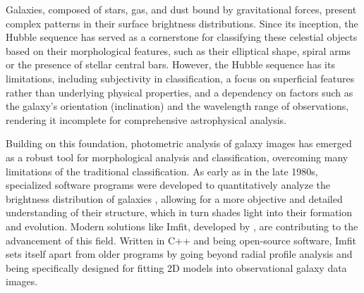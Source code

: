 Galaxies, composed of stars, gas, and dust bound by gravitational forces, present complex patterns in their surface brightness distributions. Since its inception, the Hubble sequence \citep{hubble1982realm} has served as a cornerstone for classifying these celestial objects based on their morphological features, such as their elliptical shape, spiral arms or the presence of stellar central bars. However, the Hubble sequence has its limitations, including subjectivity in classification, a focus on superficial features rather than underlying physical properties, and a dependency on factors such as the galaxy's orientation (inclination) and the wavelength range of observations, rendering it incomplete for comprehensive astrophysical analysis.

Building on this foundation, photometric analysis of galaxy images has emerged as a robust tool for morphological analysis and classification, overcoming many limitations of the traditional classification.
As early as in the late 1980s, specialized software programs were developed to quantitatively analyze the brightness distribution of galaxies \citep{stetson1987daophot, mighell1989accurate}, allowing for a more objective and detailed understanding of their structure, which in turn shades light into their formation and evolution. Modern solutions like Imfit, developed by \citet{erwin2015imfit}, are contributing to the advancement of this field. Written in C++ and being open-source software, Imfit sets itself apart from older programs by going beyond radial profile analysis and being specifically designed for fitting 2D models into observational galaxy data images.



